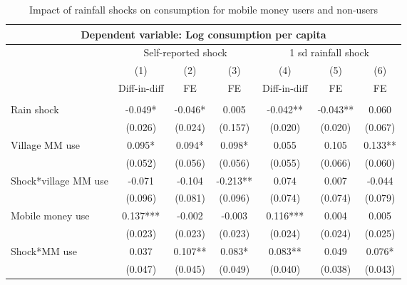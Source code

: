 \begin{table}
\begin{adjustwidth}{-1in}{-1in} 
  \centering
  \caption{Impact of rainfall shocks on consumption for mobile money users and non-users} \label{MM spill}
\begin{tabular}{lcccccc}
\multicolumn{7}{c}{Dependent variable: Log consumption per capita} \\\hline
& \multicolumn{3}{c}{ Self-reported shock} & \multicolumn{3}{c}{1 sd rainfall shock} \\ \cmidrule(r){2-4} \cmidrule(l){5-7}
 & (1) & (2) & (3)  & (4) & (5) & (6)  \\

  & Diff-in-diff & FE & FE & Diff-in-diff & FE & FE \\ \hline
 &  &  &  &  &  &  \\
Rain shock & -0.049* & -0.046* & 0.005   & -0.042** & -0.043** & 0.060 \\
  & (0.026) & (0.024) & (0.157) & (0.020) & (0.020) & (0.067) \\
Village MM use  & 0.095* & 0.094* & 0.098* & 0.055 & 0.105 & 0.133** \\
 & (0.052) & (0.056) & (0.056) & (0.055) & (0.066) & (0.060) \\
Shock*village MM use & -0.071 & -0.104 & -0.213** & 0.074 & 0.007 & -0.044 \\
& (0.096) & (0.081) & (0.096)   & (0.074) & (0.074) & (0.079)  \\
Mobile money use & 0.137*** & -0.002 & -0.003 & 0.116*** & 0.004 & 0.005 \\
 & (0.023) & (0.023) & (0.023) & (0.024) & (0.024) & (0.025) \\
Shock*MM use   & 0.037 & 0.107** & 0.083* & 0.083** & 0.049 & 0.076* \\
 & (0.047) & (0.045) & (0.049) & (0.040) & (0.038) & (0.043) \\


\end{tabular}
\end{adjustwidth}
\end{table}
